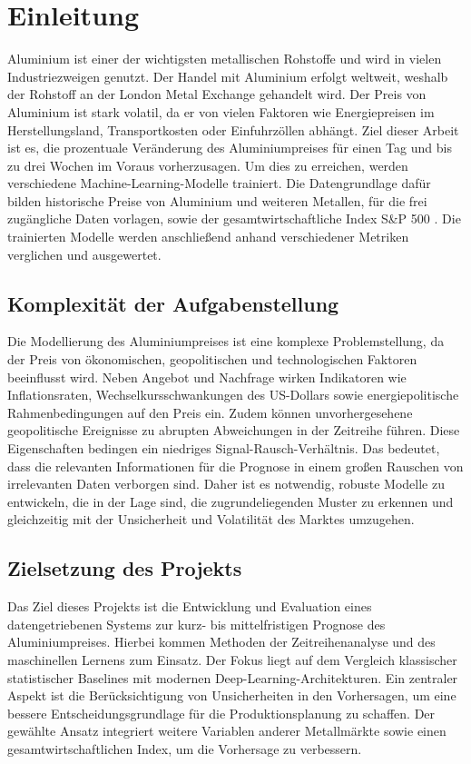 \section{Einleitung}
\label{sec:einleitung}

Aluminium ist einer der wichtigsten metallischen Rohstoffe und wird in vielen Industriezweigen genutzt.
Der Handel mit Aluminium erfolgt weltweit, weshalb der Rohstoff an der London Metal Exchange \cite{Home} gehandelt wird.
Der Preis von Aluminium ist stark volatil, da er von vielen Faktoren wie Energiepreisen im Herstellungsland, Transportkosten oder Einfuhrzöllen abhängt.
Ziel dieser Arbeit ist es, die prozentuale Veränderung des Aluminiumpreises für einen Tag und bis zu drei Wochen im Voraus vorherzusagen.
Um dies zu erreichen, werden verschiedene Machine-Learning-Modelle trainiert. 
Die Datengrundlage dafür bilden historische Preise von Aluminium und weiteren Metallen, für die frei zugängliche Daten vorlagen, sowie der gesamtwirtschaftliche Index S\&P 500 \cite{Metals, SP2026}.
Die trainierten Modelle werden anschließend anhand verschiedener Metriken verglichen und ausgewertet.

\subsection{Komplexität der Aufgabenstellung}
Die Modellierung des Aluminiumpreises ist eine komplexe Problemstellung, da der Preis von ökonomischen, geopolitischen und technologischen Faktoren beeinflusst wird.
Neben Angebot und Nachfrage wirken Indikatoren wie Inflationsraten, Wechselkursschwankungen des US-Dollars sowie energiepolitische Rahmenbedingungen auf den Preis ein.
Zudem können unvorhergesehene geopolitische Ereignisse zu abrupten Abweichungen in der Zeitreihe führen.
Diese Eigenschaften bedingen ein niedriges Signal-Rausch-Verhältnis.
Das bedeutet, dass die relevanten Informationen für die Prognose in einem großen Rauschen von irrelevanten Daten verborgen sind.
Daher ist es notwendig, robuste Modelle zu entwickeln, die in der Lage sind, die zugrundeliegenden Muster zu erkennen und gleichzeitig mit der Unsicherheit und Volatilität des Marktes umzugehen.

\subsection{Zielsetzung des Projekts}
Das Ziel dieses Projekts ist die Entwicklung und Evaluation eines datengetriebenen Systems zur kurz- bis mittelfristigen Prognose des Aluminiumpreises.
Hierbei kommen Methoden der Zeitreihenanalyse und des maschinellen Lernens zum Einsatz.
Der Fokus liegt auf dem Vergleich klassischer statistischer Baselines mit modernen Deep-Learning-Architekturen.
Ein zentraler Aspekt ist die Berücksichtigung von Unsicherheiten in den Vorhersagen, um eine bessere Entscheidungsgrundlage für die Produktionsplanung zu schaffen.
Der gewählte Ansatz integriert weitere Variablen anderer Metallmärkte sowie einen gesamtwirtschaftlichen Index, um die Vorhersage zu verbessern.


